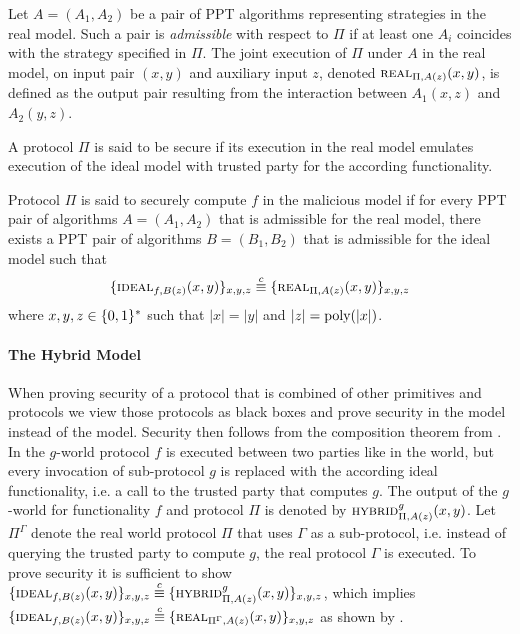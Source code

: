 \begin{definition}
Let $A=(A_1, A_2)$ be a pair of PPT algorithms representing strategies in the real model.
Such a pair is \emph{admissible} with respect to $\Pi$ if at least one $A_i$ coincides with the strategy specified in $\Pi$.
The joint execution of $\Pi$ under $A$ in the real model, on input pair $(x, y)$ and auxiliary input $z$, denoted $\REAL_{\Pi, A(z)}(x, y)$, is defined as the output pair resulting from the interaction between $A_1(x, z)$ and $A_2(y, z)$.
\end{definition}

\noindent
A protocol $\Pi$ is said to be secure if its execution in the real model emulates execution of the ideal model with trusted party for the according functionality.

\begin{definition}
Protocol $\Pi$ is said to securely compute $f$ in the malicious model if for every PPT pair of algorithms $A=(A_1, A_2)$ that is admissible for the real model, there exists a PPT pair of algorithms $B=(B_1, B_2)$ that is admissible for the ideal model such that 
\[ \{\IDEAL_{f, B(z)}(x, y)\}_{x, y, z} \stackrel{c}{\equiv} \{\REAL_{\Pi, A(z)}(x, y)\}_{x, y, z} \]
where $x,y,z\in\{0,1\}^\ast$ such that $|x|=|y|$ and $|z|=\text{poly}(|x|)$.
\end{definition}

\paragraph{The Hybrid Model}
When proving security of a protocol that is combined of other primitives and protocols we view those protocols as black boxes and prove security in the \HYBRID model instead of the \REAL model.
Security then follows from the composition theorem from \citet{Canetti00}.
In the $g$-\HYBRID world protocol $f$ is executed between two parties like in the \REAL world, but every invocation of sub-protocol $g$ is replaced with the according ideal functionality, i.e. a call to the trusted party that computes $g$.
The output of the $g$-\HYBRID world for functionality $f$ and protocol $\Pi$ is denoted by $\HYBRID_{\Pi, A(z)}^{g} (x, y)$.
Let $\Pi^\Gamma$ denote the real world protocol $\Pi$ that uses $\Gamma$ as a sub-protocol, i.e. instead of querying the trusted party to compute $g$, the real protocol $\Gamma$ is executed.
To prove security it is sufficient to show 
$\{\IDEAL_{f, B(z)}(x, y)\}_{x, y, z} \stackrel{c}{\equiv} \{\HYBRID_{\Pi, A(z)}^{g} (x, y)\}_{x, y, z}$,
which implies
$\{\IDEAL_{f, B(z)}(x, y)\}_{x, y, z} \stackrel{c}{\equiv} \{\REAL_{\Pi^{\Gamma}, A(z)} (x, y)\}_{x, y, z}$
as shown by \citet{Canetti00}.
